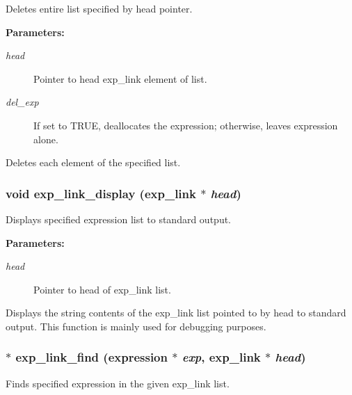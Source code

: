 Deletes entire list specified by head pointer.

\begin{Desc}
\item[{\bf Parameters: }]\par
\begin{description}
\item[
{\em head}]Pointer to head exp\_\-link element of list. \item[
{\em del\_\-exp}]If set to TRUE, deallocates the expression; otherwise, leaves expression alone.

\end{description}
\end{Desc}
Deletes each element of the specified list. 
\subsubsection{\setlength{\rightskip}{0pt plus 5cm}void exp\_\-link\_\-display ({\bf exp\_\-link} $\ast$ {\em head})}\label{link_8h_a8}


Displays specified expression list to standard output.

\begin{Desc}
\item[{\bf Parameters: }]\par
\begin{description}
\item[
{\em head}]Pointer to head of exp\_\-link list.

\end{description}
\end{Desc}
Displays the string contents of the exp\_\-link list pointed to by head to standard output. This function is mainly used for debugging purposes. 
\subsubsection{$\ast$ exp\_\-link\_\-find ({\bf expression} $\ast$ {\em exp}, {\bf exp\_\-link} $\ast$ {\em head})}\label{link_8h_a13}


Finds specified expression in the given exp\_\-link list.

